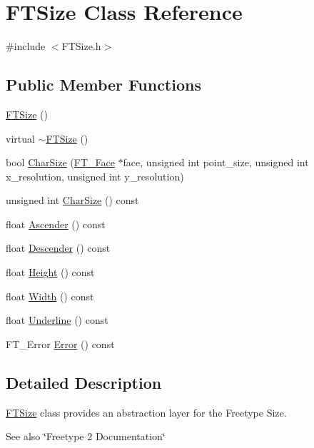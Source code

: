 \hypertarget{class_f_t_size}{
\section{FTSize Class Reference}
\label{class_f_t_size}
}


{\ttfamily \#include $<$FTSize.h$>$}

\subsection*{Public Member Functions}
\begin{DoxyCompactItemize}
\item 
\hyperlink{class_f_t_size_ae1b459031c2ab7fe6ef98530c0251700}{FTSize} ()
\item 
virtual \hyperlink{class_f_t_size_a7bf23332d879f3e9d76675290012b275}{$\sim$FTSize} ()
\item 
bool \hyperlink{class_f_t_size_a15c6c82655544d1edb101e00e42ffad9}{CharSize} (\hyperlink{struct_f_t___face_rec__}{FT\_\-Face} $\ast$face, unsigned int point\_\-size, unsigned int x\_\-resolution, unsigned int y\_\-resolution)
\item 
unsigned int \hyperlink{class_f_t_size_a489fba0a722afd8dfa2a67142cd51767}{CharSize} () const 
\item 
float \hyperlink{class_f_t_size_a7865c27cb979feace5ccce2fb544a490}{Ascender} () const 
\item 
float \hyperlink{class_f_t_size_a75c1b86d32c5ea1d296234edb1e4b7ab}{Descender} () const 
\item 
float \hyperlink{class_f_t_size_af0e7398f27936ffe4cbed04c3cfa889d}{Height} () const 
\item 
float \hyperlink{class_f_t_size_a8fe639fa29815a89cdd84138b2564840}{Width} () const 
\item 
float \hyperlink{class_f_t_size_ab85fb58156a855d01b5a4e9e1b91e0e2}{Underline} () const 
\item 
FT\_\-Error \hyperlink{class_f_t_size_a990a2df40c9c1ed06db8d34b2ac3580b}{Error} () const 
\end{DoxyCompactItemize}


\subsection{Detailed Description}
\hyperlink{class_f_t_size}{FTSize} class provides an abstraction layer for the Freetype Size.

\begin{DoxySeeAlso}{See also}
\char`\"{}Freetype 2 Documentation\char`\"{} 
\end{DoxySeeAlso}


